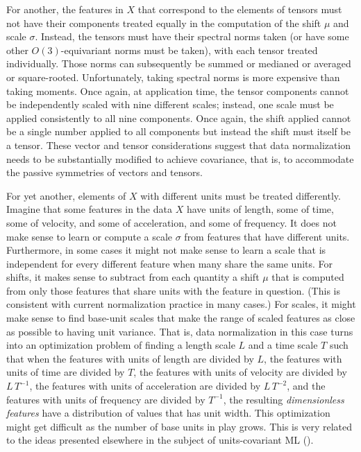 \documentclass{article} %
\begin{document}
For another, the features in $X$ that correspond to the elements of tensors must not have their components treated equally in the computation of the shift $\mu$ and scale $\sigma$.
Instead, the tensors must have their spectral norms taken (or have some other $O(3)$-equivariant norms must be taken), with each tensor treated individually.
Those norms can subsequently be summed or medianed or averaged or square-rooted.
Unfortunately, taking spectral norms is more expensive than taking moments.
Once again, at application time, the tensor components cannot be independently scaled with nine different scales; instead, one scale must be applied consistently to all nine components.
Once again, the shift applied cannot be a single number applied to all components but instead the shift must itself be a tensor.
These vector and tensor considerations suggest that data normalization needs to be substantially modified to achieve covariance, that is, to accommodate the passive symmetries of vectors and tensors.

For yet another, elements of $X$ with different units must be treated differently.
Imagine that some features in the data $X$ have units of length, some of time, some of velocity, and some of acceleration, and some of frequency.
It does not make sense to learn or compute a scale $\sigma$ from features that have different units.
Furthermore, in some cases it might not make sense to learn a scale that is independent for every different feature when many share the same units.
For shifts, it makes sense to subtract from each quantity a shift $\mu$ that is computed from only those features that share units with the feature in question.
(This is consistent with current normalization practice in many cases.)
For scales, it might make sense to find base-unit scales that make the range of scaled features as close as possible to having unit variance.
That is, data normalization in this case turns into an optimization problem of finding a length scale $L$ and a time scale $T$ such that when the features with units of length are divided by $L$, the features with units of time are divided by $T$, the features with units of velocity are divided by $L\,T^{-1}$, the features with units of acceleration are divided by $L\,T^{-2}$, and the features with units of frequency are divided by $T^{-1}$, the resulting \emph{dimensionless features} have a distribution of values that has unit width.
This optimization might get difficult as the number of base units in play grows.
This is very related to the ideas presented elsewhere in the subject of units-covariant ML (\citealt{villar2022dimensionless}).
\end{document}
